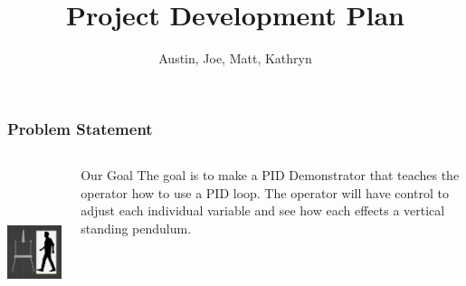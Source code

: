 \documentclass[aspectratio=169]{beamer}
\title{Project Development Plan}       %
\author{Austin, Joe, Matt, Kathryn}                     %
\institute{SNHU/CETA}                                   %
\begin{document}
\frame{\titlepage} %


\begin{frame}
    \frametitle{Problem Statement}

    \begin{columns}

    \begin{column}{0.4\textwidth}
        \includegraphics[height=5cm]{Scale}
    \end{column}

    \begin{column}{0.58\textwidth}
        \begin{block}{Our Goal}
        The goal is to make a PID Demonstrator that teaches the operator how to use a PID loop.
        The operator will have control to adjust each individual variable and see how each effects a
        vertical standing pendulum.
    \end{block}
    \end{column}
\end{columns}

\end{frame}
\end{document}
